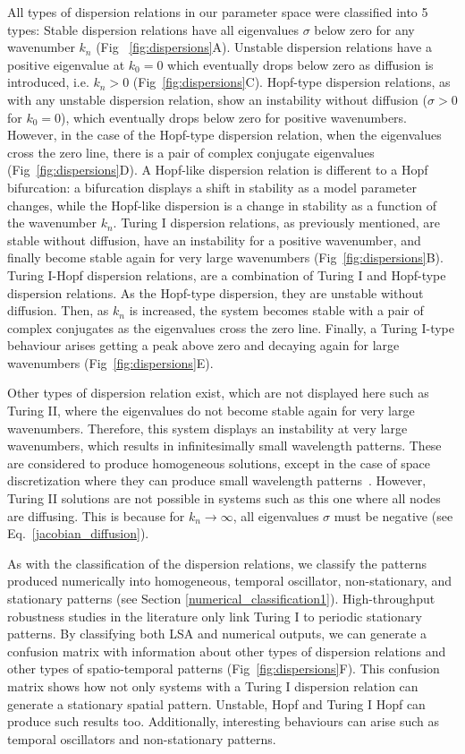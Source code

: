 All types of dispersion relations in our parameter space were classified into 5 types: Stable dispersion relations have all eigenvalues $\sigma$ below zero for any wavenumber $k_{n}$ (Fig ~\ref{fig:dispersions}A). Unstable dispersion relations have a positive eigenvalue at $k_{0}=0$ which eventually drops below zero as diffusion is introduced, i.e. $k_{n}>0$ (Fig~\ref{fig:dispersions}C). Hopf-type dispersion relations, as with any unstable dispersion relation, show an instability without diffusion ($\sigma>0$ for $k_{0}=0$), which eventually drops below zero for positive wavenumbers. However, in the case of the Hopf-type dispersion relation, when the eigenvalues cross the zero line, there is a pair of complex conjugate eigenvalues (Fig~\ref{fig:dispersions}D).
A Hopf-like dispersion relation is different to a Hopf bifurcation: a bifurcation displays a shift in stability as a model parameter changes, while the Hopf-like dispersion is a change in stability as a function of the wavenumber $k_{n}$.
Turing I dispersion relations, as previously mentioned, are stable without diffusion, have an instability for a positive wavenumber, and finally become stable again for very large wavenumbers (Fig~\ref{fig:dispersions}B).
Turing I-Hopf dispersion relations, are a combination of Turing I and Hopf-type dispersion relations. As the Hopf-type dispersion, they are unstable without diffusion. Then, as $k_{n}$ is increased, the system becomes stable with a pair of complex conjugates as the eigenvalues cross the zero line.
Finally, a Turing I-type behaviour arises getting a peak above zero and decaying again for large wavenumbers (Fig~\ref{fig:dispersions}E).

Other types of dispersion relation exist, which are not displayed here such as Turing II, where the eigenvalues do not become stable again for very large wavenumbers.
Therefore, this system displays an instability at very large wavenumbers, which results in infinitesimally small wavelength patterns.
These are considered to produce homogeneous solutions, except in the case of space discretization where they can produce small wavelength patterns~\parencite{Wang2022}.
However, Turing II solutions are not possible in systems such as this one where all nodes are diffusing.
This is because for $k_n \rightarrow \infty$, all eigenvalues $\sigma$ must be negative (see Eq.~\ref{jacobian_diffusion}).

As with the classification of the dispersion relations, we classify the patterns produced numerically into homogeneous, temporal oscillator, non-stationary, and stationary patterns (see Section \ref{numerical_classification1}).
High-throughput robustness studies in the literature only link Turing I to periodic stationary patterns.
By classifying both LSA and numerical outputs, we can generate a confusion matrix with information about other types of dispersion relations and other types of spatio-temporal patterns (Fig~\ref{fig:dispersions}F). This confusion matrix shows how not only systems with a Turing I dispersion relation can generate a stationary spatial pattern.
Unstable, Hopf and Turing I Hopf can produce such results too. Additionally, interesting behaviours can arise such as temporal oscillators and non-stationary patterns.

